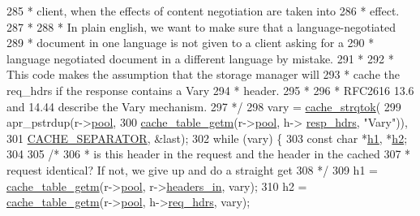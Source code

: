 \begin{DoxyCode}
285 \textcolor{comment}{             * client, when the effects of content negotiation are taken into}
286 \textcolor{comment}{             * effect.}
287 \textcolor{comment}{             *}
288 \textcolor{comment}{             * In plain english, we want to make sure that a language-negotiated}
289 \textcolor{comment}{             * document in one language is not given to a client asking for a}
290 \textcolor{comment}{             * language negotiated document in a different language by mistake.}
291 \textcolor{comment}{             *}
292 \textcolor{comment}{             * This code makes the assumption that the storage manager will}
293 \textcolor{comment}{             * cache the req\_hdrs if the response contains a Vary}
294 \textcolor{comment}{             * header.}
295 \textcolor{comment}{             *}
296 \textcolor{comment}{             * RFC2616 13.6 and 14.44 describe the Vary mechanism.}
297 \textcolor{comment}{             */}
298             vary = \hyperlink{group__Cache__util_gada03570414af2b2d9349449858036d90}{cache\_strqtok}(
299                     apr\_pstrdup(r->\hyperlink{structrequest__rec_aa0a0c16f9a9ab3901cdb3f3c9c9d83d0}{pool},
300                             \hyperlink{group__Cache__util_ga46b2ea303b9ec2767a61d0f121835b43}{cache\_table\_getm}(r->\hyperlink{structrequest__rec_aa0a0c16f9a9ab3901cdb3f3c9c9d83d0}{pool}, h->
      \hyperlink{structcache__handle_a66c4c1875bb9740d34ddda4d3e71065e}{resp\_hdrs}, \textcolor{stringliteral}{"Vary"})),
301                     \hyperlink{group__Cache__util_ga2916636af38fdf277cb80c1c698c291a}{CACHE\_SEPARATOR}, &last);
302             \textcolor{keywordflow}{while} (vary) \{
303                 \textcolor{keyword}{const} \textcolor{keywordtype}{char} *\hyperlink{group__apr__hash_ga7424aa17231f37fcf2350b861ca9b549}{h1}, *\hyperlink{group__apr__hash_gaebeb34ebcc8806faa82df3123f4423cf}{h2};
304 
305                 \textcolor{comment}{/*}
306 \textcolor{comment}{                 * is this header in the request and the header in the cached}
307 \textcolor{comment}{                 * request identical? If not, we give up and do a straight get}
308 \textcolor{comment}{                 */}
309                 h1 = \hyperlink{group__Cache__util_ga46b2ea303b9ec2767a61d0f121835b43}{cache\_table\_getm}(r->\hyperlink{structrequest__rec_aa0a0c16f9a9ab3901cdb3f3c9c9d83d0}{pool}, r->\hyperlink{structrequest__rec_a5497da6c01af49acf70a4a9b975c1c83}{headers\_in}, vary);
310                 h2 = \hyperlink{group__Cache__util_ga46b2ea303b9ec2767a61d0f121835b43}{cache\_table\_getm}(r->\hyperlink{structrequest__rec_aa0a0c16f9a9ab3901cdb3f3c9c9d83d0}{pool}, h->\hyperlink{structcache__handle_a3d302af4d74f9067d16e6398f0b709ae}{req\_hdrs}, vary);

\end{DoxyCode}
